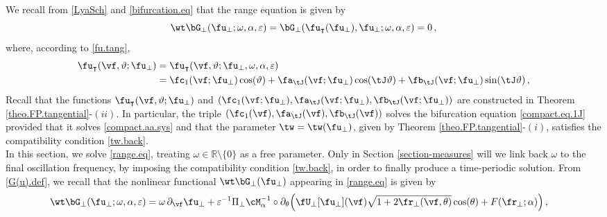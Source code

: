 \documentclass[a4paper,reqno,10pt]{article}
\newcommand{\pa}{\partial}
\begin{document}
\medskip

We recall from \eqref{LyaSch} and \eqref{bifurcation.eq} that the {range equation} is given by
\begin{equation}\label{range.eq}
	\wt\bG_{\perp}(\fu_{\perp};\omega,\alpha,\varepsilon) = \bG_{\perp} (\fu_{\intercal}(\fu_{\perp}),\fu_{\perp};\omega,\alpha,\varepsilon)=0\,,
\end{equation}
where,  according to  \eqref{fu.tang},
	\begin{align}
		\fu_{\intercal}(\vf,\vartheta;\fu_{\perp}) & = \fu_{\intercal}(\vf,\vartheta;\fu_{\perp},\omega,\alpha,\varepsilon)\\
		& = \fc_{1}(\vf;\fu_{\perp}) \cos(\vartheta) + \fa_{\tJ}(\vf;\fu_{\perp})\cos(\tJ\vartheta)+\fb_{\tJ}(\vf;\fu_{\perp})\sin(\tJ\vartheta) \,, \label{fu.tang.sol.NM}
	\end{align}
Recall that the functions $\fu_{\intercal}(\vf,\vartheta;\fu_{\perp})$ and 
$(\fc_{1}(\vf;\fu_{\perp}), \fa_{\tJ}(\vf;\fu_{\perp}), \fb_{\tJ}(\vf;\fu_{\perp}))$ 
are constructed in Theorem \ref{theo.FP.tangential}-$(ii)$. 
In particular, the triple $(\fc_{1}(\vf), \fa_{\tJ}(\vf), \fb_{\tJ}(\vf))$ 
solves the bifurcation equation \eqref{compact.eq.1J} provided that it solves 
\eqref{compact.aa.sys} and that the parameter $\tw=\tw(\fu_{\perp})$, 
given by Theorem \ref{theo.FP.tangential}-$(i)$, satisfies the compatibility condition \eqref{tw.back}.\\
In this section, we solve \eqref{range.eq}, treating $\omega \in \mathbb{R} \setminus \{0\}$ as a free parameter. 
Only in Section \ref{section-measures} will we link back  $\omega$ to the final oscillation frequency, by imposing  the compatibility condition \eqref{tw.back}, in order to finally  produce a time-periodic solution.
%
From \eqref{G(u).def}, we recall that  the nonlinear functional $\wt\bG_{\perp}(\fu_{\perp})$ appearing in \eqref{range.eq} is given by 
\begin{equation}
	\begin{aligned}
		\wt\bG_{\perp}(\fu_{\perp};\omega,\alpha,\varepsilon) & = \omega\,\pa_{\vf} \fu_{\perp} + \varepsilon^{-1} \Pi_{\perp} \cM_{\alpha}^{-1} \circ \pa_{\theta} \Big(\fU_{\perp}[\fu_{\perp}](\vf) \sqrt{1+2\fr_{\perp}(\vf,\theta)}\cos(\theta) + F(\fr_{\perp};\alpha) \Big) \,,
	\end{aligned}
\end{equation}
\end{document}
